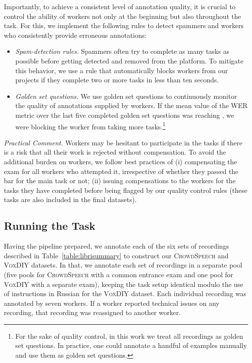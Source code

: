 \documentclass{article}
\newcommand{\speech}{\textsc{CrowdSpeech}}
\newcommand{\vox}{\textsc{VoxDIY}}
\begin{document}
Importantly, to achieve a consistent level of annotation quality, it is crucial to control the ability of workers not only at the beginning but also throughout the task. For this, we implement the following rules to detect spammers and workers who consistently provide erroneous annotations:

\begin{itemize}[itemsep=2pt, leftmargin=15pt, topsep=0pt]
  \item \emph{Spam-detection rules.} Spammers often try to complete as many tasks as possible before getting detected and removed from the platform. To mitigate this behavior, we use a rule that automatically blocks workers from our projects if they complete two or more tasks in less than ten seconds.
  
  \item \emph{Golden set questions.} We use golden set questions to continuously monitor the quality of annotations supplied by workers. If the mean value of the WER metric over the last five completed golden set questions was reaching , we were blocking the worker from taking more tasks.\footnote{For the sake of quality control, in this work we treat all recordings as golden set questions. In practice, one could annotate a handful of examples manually and use them as golden set questions.}
\end{itemize}

\emph{Practical Comment.} Workers may be hesitant to participate in the tasks if there is a risk that all their work is rejected without compensation. To avoid the additional burden on workers, we follow best practices of (i) compensating the exam for all workers who attempted it, irrespective of whether they passed the bar for the main task or not; (ii) issuing compensations to the workers for the tasks they have completed before being flagged by our quality control rules (these tasks are also included in the final datasets).

\subsection{Running the Task}

Having the pipeline prepared, we annotate each of the six sets of recordings described in Table~\ref{table:librisummary} to construct our \speech{} and \vox{} datasets. In that, we annotate each set of recordings in a separate pool (five pools for \speech{} with a common entrance exam and one pool for \vox{} with a separate exam), keeping the task setup identical modulo the use of instructions in Russian for the \vox{} dataset.  Each individual recording was annotated by seven workers. If a worker reported technical issues on any recording, that recording was reassigned to another worker. 
\end{document}
